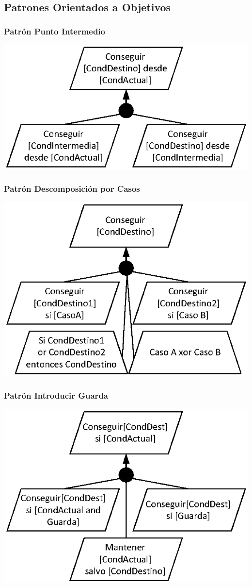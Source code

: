 \documentclass[slidestop,xcolor=pst,dvips,blue]{beamer}
\begin{document}
\subsection{Patrones Orientados a Objetivos}

\begin{frame}[c]
    \frametitle{Patrón Punto Intermedio}
    \begin{center}
        \includegraphics[width=0.70\linewidth,keepaspectratio=true]{images/objetivos/milestonePattern.eps}
    \end{center}
\end{frame}

\begin{frame}[c]
    \frametitle{Patrón Descomposición por Casos}
    \begin{center}
        \includegraphics[width=0.70\linewidth,keepaspectratio=true]{images/objetivos/casePattern.eps}
    \end{center}
\end{frame}

\begin{frame}[c]
    \frametitle{Patrón Introducir Guarda}
    \begin{center}
        \includegraphics[width=0.70\linewidth,keepaspectratio=true]{images/objetivos/guardPattern.eps}
    \end{center}
\end{frame}
\end{document}
